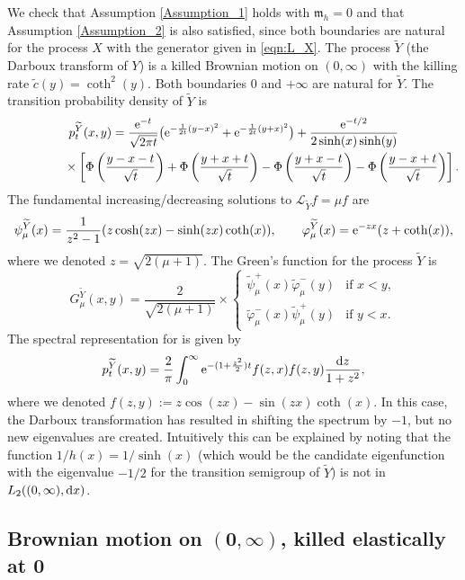 \documentclass[pdftex]{sigma}
\numberwithin{equation}{section}
\theoremstyle{definition}
\def\L{{\mathcal L}}
\def\d{{\textnormal d}}
\begin{document}
We check that Assumption \ref{Assumption_1} holds with ${\mathfrak m}_h=0$ and that Assumption \ref{Assumption_2} is also satisfied, since both boundaries are natural for the process $X$ with the generator given in \eqref{eqn:L_X}. The process $\widetilde Y$ (the Darboux transform of $Y$) is a killed Brownian motion on $(0,\infty)$ with the killing rate $\tilde c(y)=\coth^{2}(y)$. Both boundaries $0$ and $+\infty$ are natural for $\widetilde Y$. The transition probability density of $\widetilde Y$ is
\begin{gather*}
p_t^{\widetilde Y}(x,y)=\frac{{\rm e}^{-t}}{\sqrt{2\pi t}} \bigl({\rm e}^{-\frac{1}{2t}(y-x)^2}+{\rm e}^{-\frac{1}{2t}(y+x)^2}\bigr) + \frac{{\rm e}^{-t/2}}{2\sinh(x) \sinh(y)} \\
\hphantom{p_t^{\widetilde Y}(x,y)=}{}\times\left[
\Phi\left( \frac{y-x-t}{\sqrt{t}} \right) + \Phi\left( \frac{y+x+t}{\sqrt{t}} \right)
-\Phi\left( \frac{y+x-t}{\sqrt{t}} \right)-\Phi\left( \frac{y-x+t}{\sqrt{t}} \right)\right].
\end{gather*}
The fundamental increasing/decreasing solutions to $\L_{\widetilde Y} f = \mu f$ are
\[
 \psi^{\widetilde Y}_{\mu}(x)=\frac{1}{z^2-1} ( z \cosh(zx) - \sinh(zx) \coth(x)), \qquad
 \varphi^{\widetilde Y}_{\mu}(x)={\rm e}^{-zx} (z+\coth(x)),
\]
where we denoted $z=\sqrt{2(\mu+1)}$. The Green's function for the process $\tilde Y$ is
\[
G^{\widetilde Y}_{\mu}(x,y)=\frac{2}{\sqrt{2(\mu+1)}} \times
\begin{cases}
\tilde \psi^+_{\mu}(x) \tilde \varphi^-_{\mu}(y) &\text{if }  x<y,\\
\tilde \varphi^-_{\mu}(x)\tilde \psi^+_{\mu}(y)  &\text{if }  y<x.
\end{cases}
\]
The spectral representation for  is given by
\begin{equation}\label{tilde_p_spectral2}
p^{\widetilde Y}_t(x,y)=\frac{2}{\pi} \int_0^{\infty} {\rm e}^{-(1+\frac{z^2}{2}) t}
f(z,x) f(z,y) \frac{\d z}{1+z^2},
\end{equation}
where we denoted $f(z,y):=z \cos(zx)-\sin(zx) \coth(x)$. In this case, the Darboux transformation has resulted in shifting the spectrum by $-1$, but no new eigenvalues are created. Intuitively this can be explained by noting that the function $1/h(x)=1/\sinh(x)$ (which would be the candidate eigenfunction with the eigenvalue $-1/2$ for the transition semigroup of $\tilde Y$) is not in~${L_2((0,\infty),\d x)}$.

\subsection[Brownian motion on (0,infty), killed elastically at 0]{Brownian motion on $\boldsymbol{(0,\infty)}$, killed elastically at $\boldsymbol{0}$}\label{example3}
\end{document}
